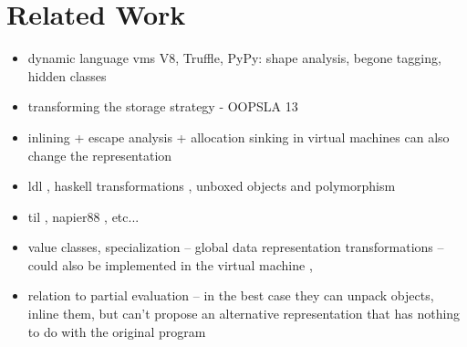 \section{Related Work}
\label{sec:related}


\begin{itemize}
  \item dynamic language vms V8, Truffle, PyPy: shape analysis, begone tagging, hidden classes
  \item transforming the storage strategy - OOPSLA 13
  \item inlining + escape analysis + allocation sinking in virtual machines can also change the representation
  \item ldl \cite{ldl}, haskell transformations \cite{spj-unboxed-values} \cite{thiemann-unboxed-objects-cps} \cite{shao-flexible-representation-analysis}, unboxed objects and polymorphism \cite{leroy-unboxed-objects}
  \item til \cite{tarditi-til, harper-intensional-type-analysis}, napier88 \cite{morrison-napier88}, etc...
  \item value classes\cite{sip-value-classes}, specialization \cite{iuli-thesis, miniboxing} -- global data representation transformations -- could also be implemented in the virtual machine \cite{goetz-specialization}, \cite{rose-value-classes-vm, rose-value-classes-tearing}
  \item relation to partial evaluation -- in the best case they can unpack objects, inline them, but can't propose an alternative representation that has nothing to do with the original program
\end{itemize}
